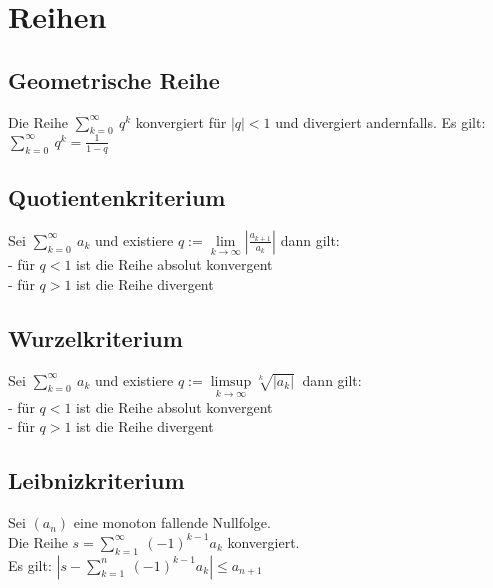 \documentclass[german]{latex4ei/latex4ei_sheet}
\begin{document}
\section{Reihen}

\begin{sectionbox}
	\subsection{Geometrische Reihe}
	Die Reihe $\sum \limits_{k=0}^{\infty}\ q^k$ konvergiert für $|q|<1$ und divergiert andernfalls. Es gilt:\\
	$\sum \limits_{k=0}^{\infty}\ q^k = \frac{1}{1-q}$

\end{sectionbox}

\begin{sectionbox}
	\subsection{Quotientenkriterium}
	Sei $\sum \limits_{k=0}^{\infty}\ a_k$ und existiere
	$q := \lim\limits_{k \to \infty} |\frac{a_{k+1}}{a_k}| $ dann gilt: \\
	- für $q<1$ ist die Reihe absolut konvergent\\
	- für $q>1$ ist die Reihe divergent

\end{sectionbox}

\begin{sectionbox}
	\subsection{Wurzelkriterium}

		Sei $\sum \limits_{k=0}^{\infty}\ a_k$ und existiere
	$q := \limsup \limits_{k \to \infty} \sqrt[k]{|a_k|}\ $ dann gilt: \\
	- für $q<1$ ist die Reihe absolut konvergent\\
	- für $q>1$ ist die Reihe divergent

\end{sectionbox}

\begin{sectionbox}
	\subsection{Leibnizkriterium}
	Sei $(a_n)$ eine monoton fallende Nullfolge.\\Die  Reihe $s = \sum \limits_{k=1}^{\infty}\ (-1)^{k-1} a_k$ konvergiert.\\
	Es gilt: $|s - \sum \limits_{k=1}^{n}\ (-1)^{k-1} a_k| \le a_{n+1}$




\end{sectionbox}
\end{document}
